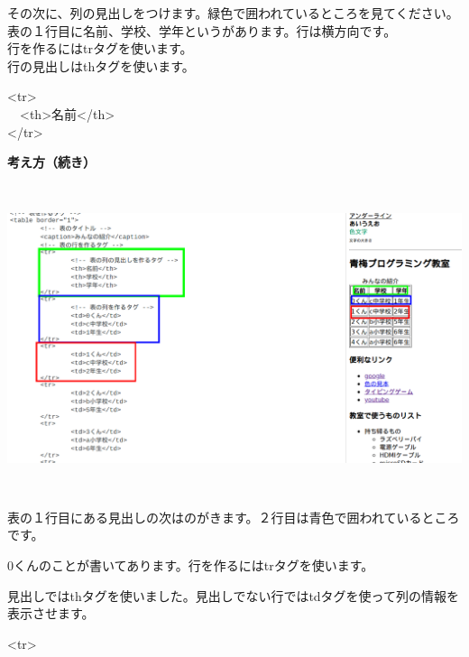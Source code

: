 \documentclass[a4paper,12pt]{jarticle}
\begin{document}
\bigskip

その次に、列の見出しをつけます。緑色で囲われているところを見てください。\\
表の１行目に名前、学校、学年というがあります。行は横方向です。\\
行を作るにはtrタグを使います。\\
行の見出しはthタグを使います。\\


\bigskip

{\textless}tr{\textgreater}\\
\ \ {\textless}th{\textgreater}名前{\textless}/th{\textgreater}\\
{\textless}/tr{\textgreater}\\

\bigskip

\clearpage
\textbf{考え方（続き）}



\bigskip

\bigskip


\centering
\includegraphics[width=16.388cm,height=9.036cm]{textbook-img191.png}

\flushleft

\bigskip

表の１行目にある見出しの次はのがきます。２行目は青色で囲われているところです。

0くんのことが書いてあります。行を作るにはtrタグを使います。

見出しではthタグを使いました。見出しでない行ではtdタグを使って列の情報を表示させます。

{\textless}tr{\textgreater}
\end{document}

